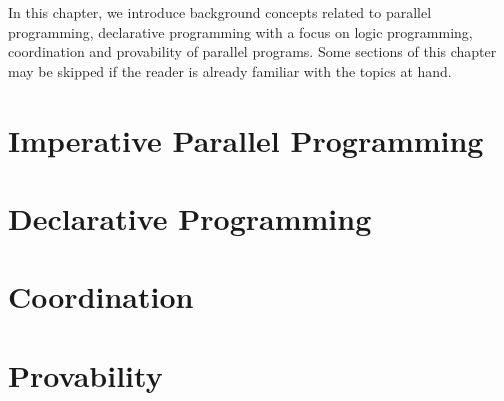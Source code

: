 In this chapter, we introduce background concepts related to parallel
programming, declarative programming with a focus on logic programming,
coordination and provability of parallel programs. Some sections of this chapter
may be skipped if the reader is already familiar with the topics at hand.

\section{Imperative Parallel Programming}


\section{Declarative Programming}\label{section:background:declarative}


\section{Coordination}\label{sec:background:coordination}


\section{Provability}

